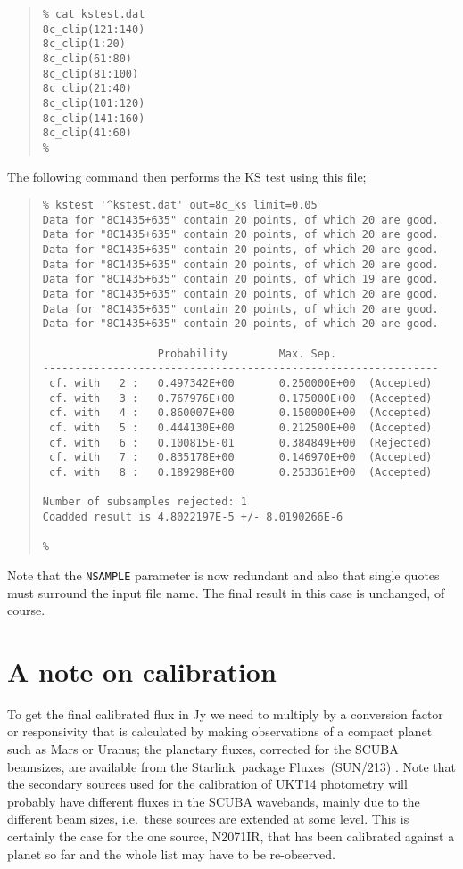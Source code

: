 \documentclass[twoside,11pt,fleqn]{article}
\newenvironment{myquote}{\begin{quote}\begin{small}}{\end{small}\end{quote}}
\newcommand{\starlink}{\htmladdnormallink{Starlink}{http://star-www.rl.ac.uk/}}
\newcommand{\fluxes}{\xref{{\sc Fluxes}}{sun213}{}}
\newcommand{\param}[1]{{\tt #1}}
\newcommand{\htmladdnormallink}[2]{#1}
\newcommand{\xref}[3]{#1}
\begin{document}
\begin{myquote}
\begin{verbatim}
% cat kstest.dat
8c_clip(121:140)
8c_clip(1:20)
8c_clip(61:80)
8c_clip(81:100)
8c_clip(21:40)
8c_clip(101:120)
8c_clip(141:160)
8c_clip(41:60)
% 
\end{verbatim}
\end{myquote}

The following command then performs the KS test using this file;

\begin{myquote}
\begin{verbatim}
% kstest '^kstest.dat' out=8c_ks limit=0.05
Data for "8C1435+635" contain 20 points, of which 20 are good.
Data for "8C1435+635" contain 20 points, of which 20 are good.
Data for "8C1435+635" contain 20 points, of which 20 are good.
Data for "8C1435+635" contain 20 points, of which 20 are good.
Data for "8C1435+635" contain 20 points, of which 19 are good.
Data for "8C1435+635" contain 20 points, of which 20 are good.
Data for "8C1435+635" contain 20 points, of which 20 are good.
Data for "8C1435+635" contain 20 points, of which 20 are good.
 
                  Probability        Max. Sep.
--------------------------------------------------------------
 cf. with   2 :   0.497342E+00       0.250000E+00  (Accepted)
 cf. with   3 :   0.767976E+00       0.175000E+00  (Accepted)
 cf. with   4 :   0.860007E+00       0.150000E+00  (Accepted)
 cf. with   5 :   0.444130E+00       0.212500E+00  (Accepted)
 cf. with   6 :   0.100815E-01       0.384849E+00  (Rejected)
 cf. with   7 :   0.835178E+00       0.146970E+00  (Accepted)
 cf. with   8 :   0.189298E+00       0.253361E+00  (Accepted)
 
Number of subsamples rejected: 1
Coadded result is 4.8022197E-5 +/- 8.0190266E-6
 
% 
\end{verbatim}
\end{myquote}
Note that the \param{NSAMPLE} parameter is now redundant and also that single
quotes must surround the input file name. The final result in this case
is unchanged, of course.

\section{A note on calibration}

To get the final calibrated flux in Jy we need to multiply by a conversion
factor or responsivity that is calculated by making observations of a compact
planet such as Mars or Uranus; the planetary fluxes, corrected for the SCUBA
beamsizes, are available from the \starlink\ package \fluxes\
(\xref{SUN/213}{sun213}{}) \cite{fluxes}. Note that the secondary sources used
for the calibration of UKT14 photometry \cite{uktphot} will probably have
different fluxes in the SCUBA wavebands, mainly due to the different beam
sizes, i.e.\ these sources are extended at some level. This is certainly the
case for the one source, N2071IR, that has been calibrated against a planet so
far and the whole list may have to be re-observed.
\end{document}
